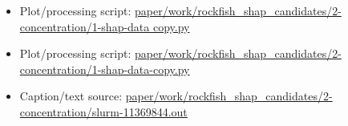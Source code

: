 \begin{itemize}[leftmargin=1.4em,noitemsep]
\item Plot/processing script: \begingroup\scriptsize\url{paper/work/rockfish_shap_candidates/2-concentration/1-shap-data copy.py}\endgroup
\item Plot/processing script: \begingroup\scriptsize\url{paper/work/rockfish_shap_candidates/2-concentration/1-shap-data-copy.py}\endgroup
\item Caption/text source: \begingroup\scriptsize\url{paper/work/rockfish_shap_candidates/2-concentration/slurm-11369844.out}\endgroup
\end{itemize}
